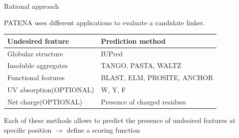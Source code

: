 \documentclass{beamer}
\begin{document}
\begin{frame}{Rational approach}
 
PATENA uses different applications to evaluate a candidate linker.
\vspace{15px}

\begin{tabular}{l|l}
\textbf{Undesired feature} & \textbf{Prediction method} \\ \hline \hline
\rowcolor{Gray} Globular structure & IUPred  \\
Insoluble aggregates & TANGO, PASTA, WALTZ   \\
\rowcolor{Gray}Functional features & BLAST, ELM, PROSITE, ANCHOR \\  
UV absorption(OPTIONAL) & W, Y, F \\ %
\rowcolor{Gray}Net charge(OPTIONAL)& Presence of charged residues\\
\end{tabular}
 
\vspace{20px} 
Each of these methods allows to predict the presence of undesired features at specific position $\rightarrow$ define a scoring function
 





\end{frame}
\end{document}
